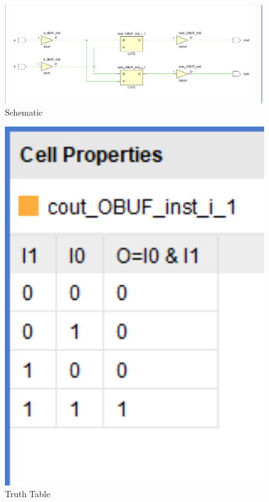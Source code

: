 \documentclass{article}
\begin{document}
\begin{figure}[h]
\begin{center}
\includegraphics[width=1\textwidth]{halfaddSchematic.png} %
\caption{Schematic}
\end{center}
\end{figure}


\begin{figure}[h]
\begin{center}
\includegraphics[width=1\textwidth]{halfaddTruthTable.png} %
\caption{Truth Table}
\end{center}
\end{figure}
\end{document}
